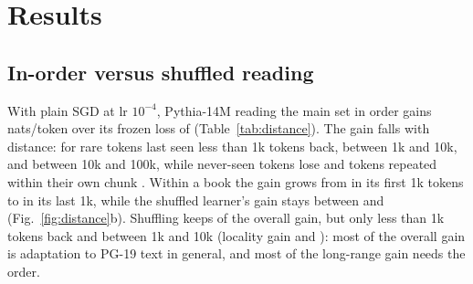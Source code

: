 \documentclass[times,twocolumn,final,authoryear]{elsarticle}
\begin{document}
\section{Results}

\subsection{In-order versus shuffled reading}\label{sec:local}

With plain SGD at lr $10^{-4}$, Pythia-14M reading the main set in order gains \gainInOrderAllPM{} nats/token over its frozen loss of \frozenLossMain{} (Table~\ref{tab:distance}).
The gain falls with distance: \gainInOrderOneKPM{} for rare tokens last seen less than 1k tokens back, \gainInOrderTenKPM{} between 1k and 10k, and \gainInOrderHundredKPM{} between 10k and 100k, while never-seen tokens lose \gainInOrderNeverPM{} and tokens repeated within their own chunk \gainInOrderSameChunkPM{}.
Within a book the gain grows from \posGainFirstPM{} in its first 1k tokens to \posGainLastPM{} in its last 1k, while the shuffled learner's gain stays between \posShuffledMin{} and \posShuffledMax{} (Fig.~\ref{fig:distance}b).
Shuffling keeps \shuffledShareAll{} of the overall gain, but only \shuffledShareOneK{} less than 1k tokens back and \shuffledShareTenK{} between 1k and 10k (locality gain \localityOneKPM{} and \localityTenKPM{}): most of the overall gain is adaptation to PG-19 text in general, and most of the long-range gain needs the order.
\end{document}
